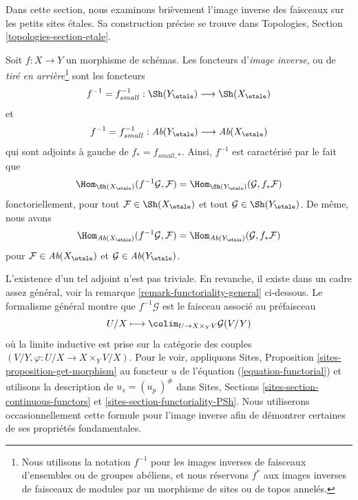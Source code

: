 \noindent
Dans cette section, nous examinons bri\`evement l'image inverse des faisceaux sur les petits
sites \'etales. Sa construction pr\'ecise se trouve dans
Topologies, Section \ref{topologies-section-etale}.

\begin{definition}
\label{definition-inverse-image}
Soit $f: X\to Y$ un morphisme de sch\'emas. Les foncteurs d'{\it image inverse}, ou
de {\it tir\'e en arri\`ere}\footnote{Nous utilisons la notation $f^{-1}$ pour les images inverses de
faisceaux d'ensembles ou de groupes ab\'eliens, et nous r\'eservons $f^*$ aux
images inverses de faisceaux de modules par un morphisme de sites ou de topos annel\'es.}
sont les foncteurs
$$
f^{-1} = f_{small}^{-1} :
\Sh(Y_\etale)
\longrightarrow
\Sh(X_\etale)
$$
et
$$
f^{-1} = f_{small}^{-1} :
\textit{Ab}(Y_\etale)
\longrightarrow
\textit{Ab}(X_\etale)
$$
qui sont adjoints \`a gauche de $f_* = f_{small, *}$. Ainsi,
$f^{-1}$ est caract\'eris\'e par le fait que
$$
\Hom_{{\Sh(X_\etale)}} (f^{-1}\mathcal{G}, \mathcal{F})
=
\Hom_{\Sh(Y_\etale)} (\mathcal{G}, f_*\mathcal{F})
$$
fonctoriellement, pour tout $\mathcal{F} \in \Sh(X_\etale)$ et tout
$\mathcal{G} \in \Sh(Y_\etale)$. De m\^eme, nous avons
$$
\Hom_{{\textit{Ab}(X_\etale)}} (f^{-1}\mathcal{G}, \mathcal{F})
=
\Hom_{\textit{Ab}(Y_\etale)} (\mathcal{G}, f_*\mathcal{F})
$$
pour $\mathcal{F} \in \textit{Ab}(X_\etale)$ et
$\mathcal{G} \in \textit{Ab}(Y_\etale)$.
\end{definition}

\noindent
L'existence d'un tel adjoint n'est pas triviale.
En revanche, il existe dans un cadre assez g\'en\'eral, voir la
remarque \ref{remark-functoriality-general}
ci-dessous. Le formalisme g\'en\'eral montre que $f^{-1}\mathcal{G}$
est le faisceau associ\'e au pr\'efaisceau
\begin{equation}
\label{equation-pullback}
U/X
\longmapsto
\colim_{U \to X \times_Y V} \mathcal{G}(V/Y)
\end{equation}
o\`u la limite inductive est prise sur la cat\'egorie des couples
$(V/Y, \varphi : U/X \to X \times_Y V/X)$.
Pour le voir, appliquons
Sites, Proposition \ref{sites-proposition-get-morphism}
au foncteur $u$ de l'\'equation (\ref{equation-functorial})
et utilisons la description de $u_s = (u_p\ )^\#$ dans
Sites, Sections \ref{sites-section-continuous-functors} et
\ref{sites-section-functoriality-PSh}.
Nous utiliserons occasionnellement cette formule pour l'image inverse
afin de d\'emontrer certaines de ses propri\'et\'es fondamentales.

